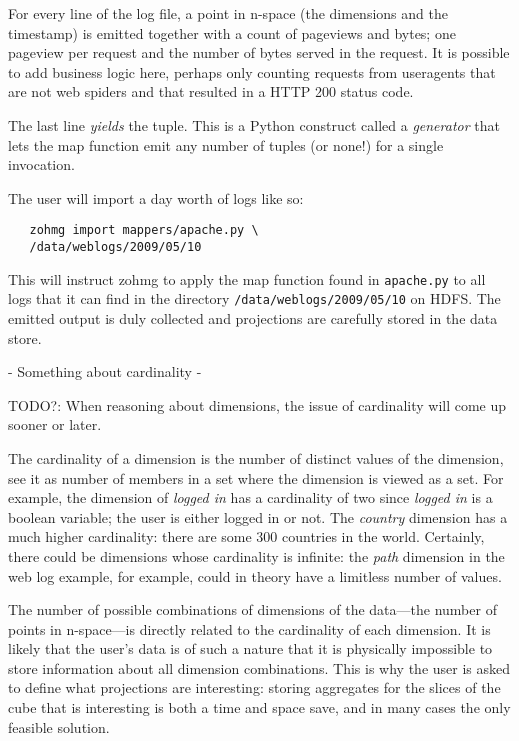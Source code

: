 \documentclass[a4paper,10pt]{book}
\begin{document}
For every line of the log file, a point in n-space (the dimensions and the
timestamp) is emitted together with a count of pageviews and bytes; one
pageview per request and the number of bytes served in the request. It is
possible to add business logic here, perhaps only counting requests from
useragents that are not web spiders and that resulted in a HTTP 200 status
code.

The last line \textit{yields} the tuple. This is a Python construct called a
\textit{generator} that lets the map function emit any number of tuples (or
none!) for a single invocation.

The user will import a day worth of logs like so:

\begin{verbatim}
   zohmg import mappers/apache.py \
   /data/weblogs/2009/05/10
\end{verbatim}

This will instruct zohmg to apply the map function found in \texttt{apache.py}
to all logs that it can find in the directory
\texttt{/data/weblogs/2009/05/10} on HDFS. The emitted output is duly
collected and projections are carefully stored in the data store.

- Something about cardinality -

TODO?: When reasoning about dimensions, the issue of cardinality will come
up sooner or later.

The cardinality of a dimension is the number of distinct values of the
dimension, see it as number of members in a set where the dimension is
viewed as a set. For example, the dimension of \textit{logged in} has a
cardinality of two since \textit{logged in} is a boolean variable; the user
is either logged in or not. The \textit{country} dimension has a much
higher cardinality: there are some 300 countries in the world. Certainly,
there could be dimensions whose cardinality is infinite: the \textit{path}
dimension in the web log example, for example, could in theory have a
limitless number of values.

The number of possible combinations of dimensions of the data---the number
of points in n-space---is directly related to the cardinality of each
dimension. It is likely that the user's data is of such a nature that it is
physically impossible to store information about all dimension
combinations.  This is why the user is asked to define what projections are
interesting: storing aggregates for the slices of the cube that is
interesting is both a time and space save, and in many cases the only
feasible solution.
\end{document}
